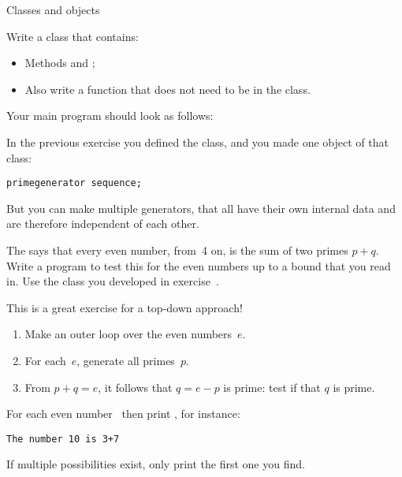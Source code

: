  {Classes and objects}
\label{sec:prime-seq-class}


\begin{comment}
  In exercise~\textbookref{ex:prime:struct} you made a structure that contains
  the data for a prime sequence, and you have separate functions that
  operate on that structure or on its members.
\end{comment}

\begin{exercise}
  \label{ex:prime:sequence}
  Write a class  that contains:
  \begin{itemize}
  \item Methods   and ;
  \item Also write a function  that does not need to be
    in the class.
  \end{itemize}

  Your main program should look as follows:
\end{exercise}

In the previous exercise you defined the  class, and
you made one object of that class:
\begin{lstlisting}
primegenerator sequence;
\end{lstlisting}
But you can make multiple generators, that all have their own internal
data and are therefore independent of each other.

\begin{exercise}
  \label{ex:goldbach:conj}
  The  says that every even number,
  from~4 on, is the sum of two primes $p+q$. Write a program to test this
  for the even numbers up to a bound that you read in.
  Use the  class you developed in exercise~.

  This is a great exercise for a top-down approach!
  \begin{enumerate}
  \item
    Make an outer loop over the even numbers~$e$.
  \item For each~$e$, generate all primes~$p$.
  \item From $p+q=e$, it follows that $q=e-p$ is prime: test if
    that $q$ is prime.
  \end{enumerate}
  For each even number~ then print , for instance:
  \begin{verbatim}
The number 10 is 3+7
  \end{verbatim}
  If multiple possibilities exist, only print the first one you find.
\end{exercise}

